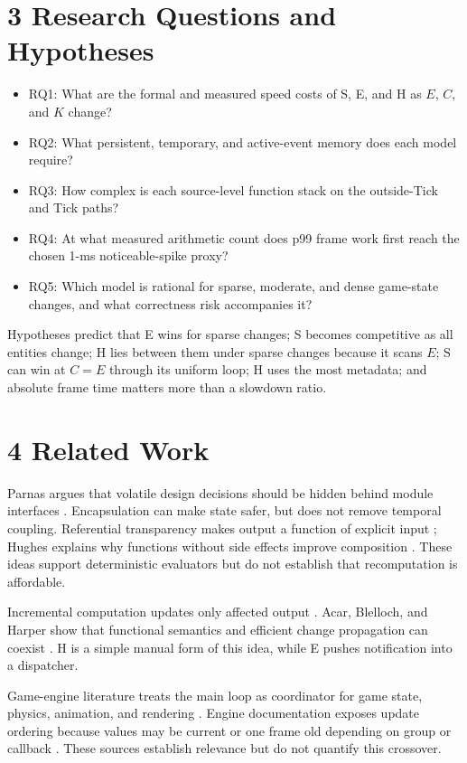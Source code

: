 \section{3 Research Questions and Hypotheses}

\begin{itemize}
\item RQ1: What are the formal and measured speed costs of S, E, and H as \(E\), \(C\), and \(K\) change?
\item RQ2: What persistent, temporary, and active-event memory does each model require?
\item RQ3: How complex is each source-level function stack on the outside-Tick and Tick paths?
\item RQ4: At what measured arithmetic count does p99 frame work first reach the chosen 1-ms noticeable-spike proxy?
\item RQ5: Which model is rational for sparse, moderate, and dense game-state changes, and what correctness risk accompanies it?
\end{itemize}

Hypotheses predict that E wins for sparse changes; S becomes competitive as all entities change; H lies between them under sparse changes because it scans \(E\); S can win at \(C=E\) through its uniform loop; H uses the most metadata; and absolute frame time matters more than a slowdown ratio.

\section{4 Related Work}

Parnas argues that volatile design decisions should be hidden behind module interfaces \cite{parnas1972}. Encapsulation can make state safer, but does not remove temporal coupling. Referential transparency makes output a function of explicit input \cite{gunter1992}; Hughes explains why functions without side effects improve composition \cite{hughes1989}. These ideas support deterministic evaluators but do not establish that recomputation is affordable.

Incremental computation updates only affected output \cite{ramalingam1993}. Acar, Blelloch, and Harper show that functional semantics and efficient change propagation can coexist \cite{acar2006}. H is a simple manual form of this idea, while E pushes notification into a dispatcher.

Game-engine literature treats the main loop as coordinator for game state, physics, animation, and rendering \cite{gregory2019}. Engine documentation exposes update ordering because values may be current or one frame old depending on group or callback \cite{epicticking,unityupdate}. These sources establish relevance but do not quantify this crossover.

